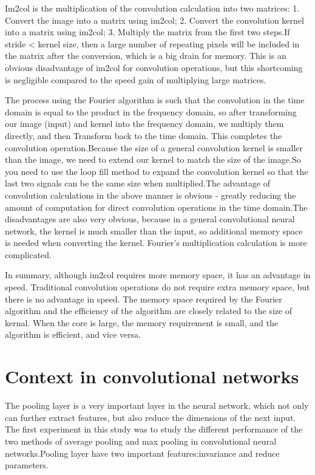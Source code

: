 \documentclass{article}
\begin{document}
Im2col is the multiplication of the convolution calculation into two matrices: 1. Convert the image into a matrix using im2col; 2. Convert the convolution kernel into a matrix using im2col; 3. Multiply the matrix from the first two steps.If stride < kernel size, then a large number of repeating pixels will be included in the matrix after the conversion, which is a big drain for memory. This is an obvious disadvantage of im2col for convolution operations, but this shortcoming is negligible compared to the speed gain of multiplying large matrices.

The process using the Fourier algorithm is such that the convolution in the time domain is equal to the product in the frequency domain, so after transforming our image (input) and kernel into the frequency domain, we multiply them directly, and then Transform back to the time domain. This completes the convolution operation.Because the size of a general convolution kernel is smaller than the image, we need to extend our kernel to match the size of the image.So you need to use the loop fill method to expand the convolution kernel so that the last two signals can be the same size when multiplied.The advantage of convolution calculations in the above manner is obvious - greatly reducing the amount of computation for direct convolution operations in the time domain.The disadvantages are also very obvious, because in a general convolutional neural network, the kernel is much smaller than the input, so additional memory space is needed when converting the kernel. Fourier's multiplication calculation is more complicated.

In summary, although im2col requires more memory space, it has an advantage in speed. Traditional convolution operations do not require extra memory space, but there is no advantage in speed. The memory space required by the Fourier algorithm and the efficiency of the algorithm are closely related to the size of kernal. When the core is large, the memory requirement is small, and the algorithm is efficient, and vice versa.

\section{Context in convolutional networks}

The pooling layer is a very important layer in the neural network, which not only can further extract features, but also reduce the dimensions of the next input. The first experiment in this study was to study the different performance of the two methods of average pooling and max pooling in convolutional neural networks.Pooling layer have two important features:invariance and reduce parameters.
\end{document}
